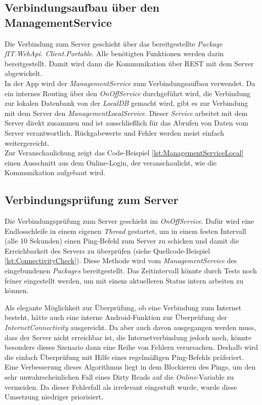 \subsection{Verbindungsaufbau über den ManagementService}
\label{ssec:nat-ManagementServiceLocal}
Die Verbindung zum Server geschieht über das bereitgestellte \textit{Package} \linebreak \textit{fIT.WebApi. Client.Portable}. Alle benötigten Funktionen werden darin bereitgestellt. Damit wird dann die Kommunikation über REST mit dem Server abgewickelt.\\
In der App wird der \textit{ManagementService} zum Verbindungsaufbau verwendet. Da ein internes Routing über den \textit{OnOffService} durchgeführt wird, die Verbindung zur lokalen Datenbank von der \textit{LocalDB} gemacht wird, gibt es zur Verbindung mit dem Server den \textit{ManagementLocalService}. Dieser \textit{Service} arbeitet mit dem Server direkt zusammen und ist ausschließlich für das Abrufen von Daten vom Server verantwortlich. Rückgabewerte und Fehler werden meist einfach weitergereicht.\\
Zur Veranschaulichung zeigt das Code-Beispiel \ref{lst:ManagementServiceLocal} einen Ausschnitt aus dem Online-Login, der veranschaulicht, wie die Kommunikation aufgebaut wird.

\subsection{Verbindungsprüfung zum Server}
\label{ssec:nat-konnektivität}
Die Verbindungsprüfung zum Server geschieht im \textit{OnOffService}. Dafür wird eine Endlosschleife in einem eigenen \textit{Thread} gestartet, um in einem festen Intervall (alle 10 Sekunden) einen Ping-Befehl zum Server zu schicken und damit die Erreichbarkeit des Servers zu überprüfen (siehe Quellcode-Beispiel \ref{lst:ConnectivityCheck}). Diese Methode wird vom \textit{ManagementService} des eingebundenen \textit{Packages} bereitgestellt. Das Zeitintervall könnte durch Tests noch feiner eingestellt werden, um mit einem aktuelleren Status intern arbeiten zu können.

Als elegante Möglichkeit zur Überprüfung, ob eine Verbindung zum Internet besteht, hätte auch eine interne \gls{Android}-Funktion zur Überprüfung der \textit{InternetConnectivity} ausgereicht. Da aber auch davon ausgegangen werden muss, dass der Server nicht erreichbar ist, die Internetverbindung jedoch noch, könnte besonders dieses Szenario dann eine Reihe von Fehlern verursachen. Deshalb wird die einfach Überprüfung mit Hilfe eines regelmäßigen Ping-Befehls präferiert.\\
Eine Verbesserung dieses Algorithmus liegt in dem Blockieren des Pings, um den sehr unwahrscheinlichen Fall eines \glspl{Dirty Read} auf die \textit{Online}-Variable zu vermeiden. Da dieser Fehlerfall als irrelevant eingestuft wurde, wurde diese Umsetzung niedriger priorisiert.
